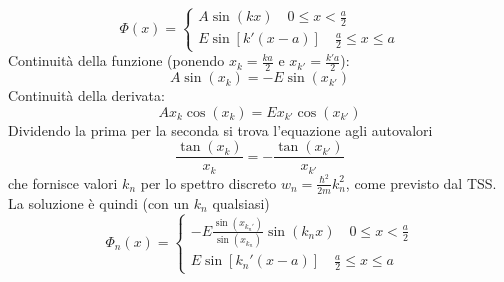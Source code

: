 \documentclass[a4paper]{article}
\begin{document}
        \begin{equation*}
            \Phi(x)=
            \begin{cases}
                A\sin(kx)\quad 0\leq x <\frac{a}{2}\\
                E\sin[k'(x-a)]\quad \frac{a}{2}\leq x \leq a
            \end{cases}
        \end{equation*}
        Continuità della funzione (ponendo $x_k=\frac{ka}{2}$ e $x_{k'}=\frac{k'a}{2}$):
        \begin{equation*}
            A\sin(x_k)=-E\sin(x_{k'})
        \end{equation*}
        Continuità della derivata:
        \begin{equation*}
            Ax_k\cos(x_k)=Ex_{k'}\cos(x_{k'})
        \end{equation*}
        Dividendo la prima per la seconda si trova l'equazione agli autovalori
        \begin{equation*}
            \frac{\tan(x_k)}{x_k}=-\frac{\tan(x_{k'})}{x_{k'}}
        \end{equation*}
        che fornisce valori $k_n$ per lo spettro discreto $w_n=\frac{\hbar^2}{2m}k_n^2$, come previsto dal TSS.
        La soluzione è quindi (con un $k_n$ qualsiasi)
        \begin{equation*}
            \Phi_n(x)=
            \begin{cases}
                -E\frac{\sin(x_{k_n'})}{\sin(x_{k_n})}\sin(k_nx)\quad 0\leq x <\frac{a}{2}\\
                E\sin[k_n'(x-a)]\quad \frac{a}{2}\leq x \leq a
            \end{cases}
        \end{equation*}
        \begin{center}
        \end{center}
\end{document}
